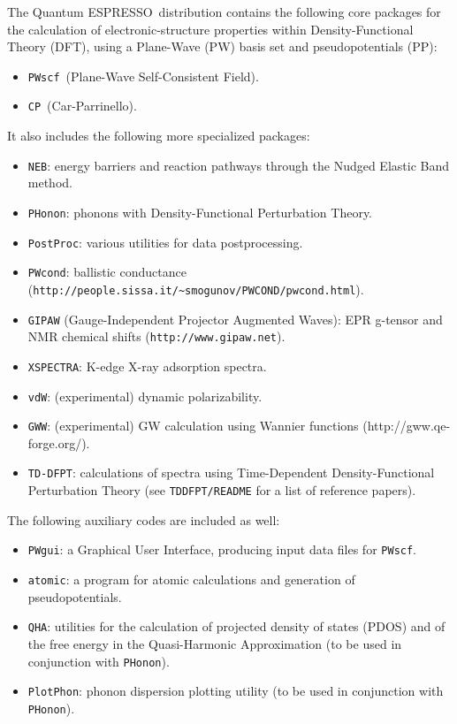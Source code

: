 \documentclass[12pt,a4paper]{article}
\def\qe{{\sc Quantum ESPRESSO}}
\def\PWscf{\texttt{PWscf}}
\def\PHonon{\texttt{PHonon}}
\def\CP{\texttt{CP}}
\def\PostProc{\texttt{PostProc}}
\begin{document}
The \qe\ distribution contains the following core packages 
for the calculation of electronic-structure properties within
Density-Functional Theory (DFT), using a Plane-Wave (PW) basis set 
and pseudopotentials (PP):
\begin{itemize}
  \item \PWscf\ (Plane-Wave Self-Consistent Field).
  \item \CP\ (Car-Parrinello).
\end{itemize}
It also includes the following more specialized packages:
\begin{itemize}
  \item \texttt{NEB}:
        energy barriers and reaction pathways through the Nudged Elastic Band method.
  \item \PHonon:
        phonons with Density-Functional Perturbation Theory.
  \item \PostProc: various utilities for data postprocessing.
  \item \texttt{PWcond}:
        ballistic conductance (\texttt{http://people.sissa.it/\~{}smogunov/PWCOND/pwcond.html}).
  \item \texttt{GIPAW} 
  (Gauge-Independent Projector Augmented Waves):
        EPR g-tensor and NMR chemical shifts
        (\texttt{http://www.gipaw.net}).
  \item \texttt{XSPECTRA}:
        K-edge X-ray adsorption spectra.
  \item \texttt{vdW}:
        (experimental) dynamic polarizability. 
  \item \texttt{GWW}:
        (experimental) GW calculation using Wannier functions
        (http://gww.qe-forge.org/).
  \item \texttt{TD-DFPT}:
        calculations of spectra using Time-Dependent 
        Density-Functional Perturbation Theory (see \texttt{TDDFPT/README} for a list of reference papers).
\end{itemize}
The following auxiliary codes are included as well:
\begin{itemize}
\item \texttt{PWgui}:
      a Graphical User Interface, producing input data files for 
      \PWscf.
\item \texttt{atomic}:
      a program for atomic calculations and generation of pseudopotentials.
\item \texttt{QHA}:
      utilities for the calculation of projected density of states (PDOS)
      and of the free energy in the Quasi-Harmonic Approximation (to be
      used in conjunction with \PHonon).
\item \texttt{PlotPhon}:
      phonon dispersion plotting utility (to be
      used in conjunction with \PHonon).
\end{itemize}
\end{document}

